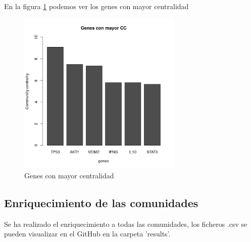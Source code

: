 En la figura \ref{fig: Figura 8} podemos ver los genes con mayor centralidad

\begin{figure}[h]
	\centering
	\includegraphics[width=0.70\textwidth]{figures/04_GenesMayorCentralidad.png}
	\caption{Genes con mayor centralidad}
	\label{fig: Figura 8}
\end{figure}



\subsection{Enriquecimiento de las comunidades}
Se ha realizado el enriquecimiento a todas las comunidades, los ficheros .csv se pueden visualizar en el GitHub en la carpeta 'results'.

